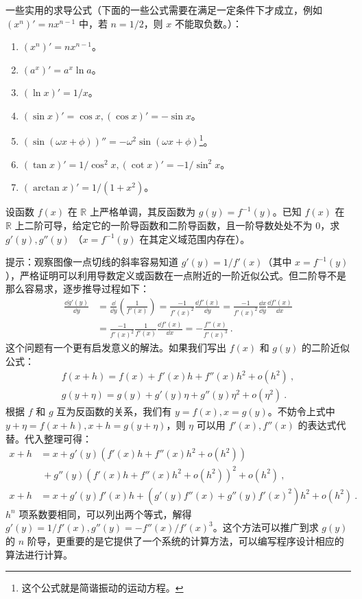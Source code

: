 一些实用的求导公式（下面的一些公式需要在满足一定条件下才成立，例如 $(x^n)'=nx^{n-1}$ 中，若 $n=1/2$，则 $x$ 不能取负数。）：
\begin{enumerate}
\item $(x^n)'=nx^{n-1}$。
\item $(a^x)'=a^x\ln a$。
\item $(\ln x)'=1/x$。
\item $(\sin x)'=\cos x,(\cos x)'=-\sin x$。\item $(\sin(\omega x+\phi))''=-\omega^2\sin(\omega x+\phi)$\footnote{这个公式就是简谐振动的运动方程。}。
\item $(\tan x)'=1/\cos^2 x,(\cot x)'=-1/\sin^2 x$。
\item $(\arctan x)'=1/(1+x^2)$。
\end{enumerate}
\begin{exercise}{}
设函数 $f(x)$ 在 $\mathbb{R}$ 上严格单调，其反函数为 $g(y)=f^{-1}(y)$。已知 $f(x)$ 在 $\mathbb{R}$ 上二阶可导，给定它的一阶导函数和二阶导函数，且一阶导数处处不为 $0$，求 $g'(y),g''(y)$ （$x=f^{-1}(y)$ 在其定义域范围内存在）。

提示：观察图像一点切线的斜率容易知道 $g'(y)=1/f'(x)$（其中 $x=f^{-1}(y)$），严格证明可以利用导数定义或函数在一点附近的一阶近似公式。但二阶导不是那么容易求，逐步推导过程如下：
\begin{equation}
\begin{aligned}
\frac{\dd g'(y)}{\dd y}&=\frac{\dd}{\dd y}\left(\frac{1}{f'(x)}\right)=\frac{-1}{f'(x)^2}\frac{\dd f'(x)}{\dd y}=\frac{-1}{f'(x)^2}\frac{\dd x}{\dd y}\frac{\dd f'(x)}{\dd x}\\
&=\frac{-1}{f'(x)^2}\frac{1}{f'(x)}\frac{\dd f'(x)}{\dd x}=-\frac{f''(x)}{f'(x)^3}~.
\end{aligned}
\end{equation}
这个问题有一个更有启发意义的解法。如果我们写出 $f(x)$ 和 $g(y)$ 的二阶近似公式：
\begin{equation}
\begin{aligned}
f(x+h)=f(x)+f'(x)h+f''(x)h^2+o(h^2)~,\\
g(y+\eta)=g(y)+g'(y)\eta+g''(y)\eta^2+o(\eta^2)~.
\end{aligned}
\end{equation}
根据 $f$ 和 $g$ 互为反函数的关系，我们有 $y=f(x),x=g(y)$。不妨令上式中 $y+\eta=f(x+h),x+h=g(y+\eta)$，则 $\eta$ 可以用 $f'(x),f''(x)$ 的表达式代替。代入整理可得：
\begin{equation}
\begin{aligned}
x+h&=x+g'(y)(f'(x)h+f''(x)h^2+o(h^2))\\
&\ +g''(y)(f'(x)h+f''(x)h^2+o(h^2))^2+o(h^2)~,\\
x+h&=x+g'(y)f'(x)h + (g'(y)f''(x)+g''(y)f'(x)^2)h^2+o(h^2)~.
\end{aligned}
\end{equation}
$h^n$ 项系数要相同，可以列出两个等式，解得 $g'(y)=1/f'(x),g''(y)=-f''(x)/f'(x)^3$。这个方法可以推广到求 $g(y)$ 的 $n$ 阶导，更重要的是它提供了一个系统的计算方法，可以编写程序设计相应的算法进行计算。
\end{exercise}